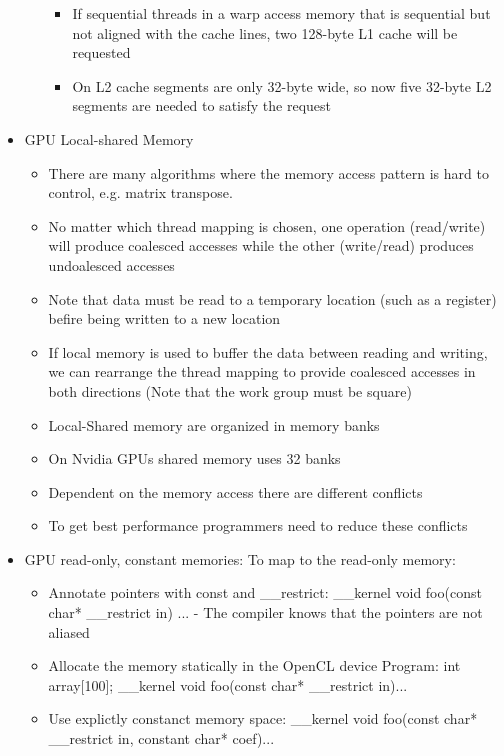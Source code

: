 \documentclass[paper=a4, fontsize=11pt]{scrartcl} %
\numberwithin{equation}{section} %
\numberwithin{figure}{section} %
\numberwithin{table}{section} %
\begin{document}
\begin{itemize}
\begin{itemize}
\begin{itemize}
      \item If sequential threads in a warp access memory that is sequential but not aligned with the cache lines, two 128-byte L1 cache will be requested
      \item On L2 cache segments are only 32-byte wide, so now five 32-byte L2 segments are needed to satisfy the request
    \end{itemize}
  \end{itemize}
  \item GPU Local-shared Memory
  \begin{itemize}
    \item There are many algorithms where the memory access pattern is hard to control, e.g. matrix transpose.
    \item No matter which thread mapping is chosen, one operation (read/write) will produce coalesced accesses while the other (write/read) produces undoalesced accesses
    \item Note that data must be read to a temporary location (such as a register) befire being written to a new location
    \item If local memory is used to buffer the data between reading and writing, we can rearrange the thread mapping to provide coalesced accesses in both directions (Note that the work group must be square)
    \item Local-Shared memory are organized in memory banks
    \item On Nvidia GPUs shared memory uses 32 banks
    \item Dependent on the memory access there are different conflicts
    \item To get best performance programmers need to reduce these conflicts
  \end{itemize}
  \item GPU read-only, constant memories: To map to the read-only memory:
  \begin{itemize}
    \item Annotate pointers with const and __restrict: __kernel void foo(const char* __restrict in) {...} - The compiler knows that the pointers are not aliased
    \item Allocate the memory statically in the OpenCL device Program: int array[100]; __kernel void foo(const char* __restrict in){...}
    \item Use explictly constanct memory space: __kernel void foo(const char* __restrict in, constant char* coef){...}
  \end{itemize}

\end{itemize}
\end{document}
